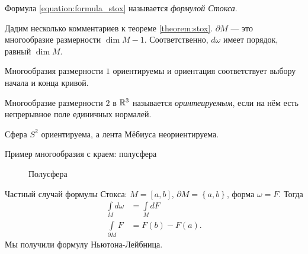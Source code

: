 Формула \eqref{equation:formula_stox} называется \textit{формулой Стокса}.

Дадим несколько комментариев к теореме \ref{theorem:stox}. $\partial M$ --- это многообразие размерности  $\dim M - 1$.  Соответственно, $d \omega$  имеет порядок, равный $\dim M$.

Многообразия размерности $1$  ориентируемы и ориентация соответствует выбору начала и конца кривой.

\begin{df}
 Многообразие размерности $2$ в $\mathbb{R}^{3}$ называется \textit{оринтеируемым}, если на нём есть непрерывное поле единичных нормалей.
\end{df}
\begin{exmpl*}
 Сфера $S^{2}$ ориентируема, а лента Мёбиуса неориентируема.
\end{exmpl*}
\begin{exmpl}
 Пример многообразия с краем: полусфера
\begin{figure}[ht]
    \centering
    \caption{Полусфера}
    \label{fig:halfsphere}
\end{figure}
\end{exmpl}

Частный случай формулы Стокса: $M = [a,b]$,  $\partial M = \left\{ a,b \right\}$, форма $\omega = F$. Тогда
 \begin{align*}
  \int\limits_{M} d\omega &= \int\limits_{M} d F \\
 \int\limits_{\partial M} F &= F(b) - F(a)
.\end{align*} Мы получили формулу Ньютона-Лейбница.
